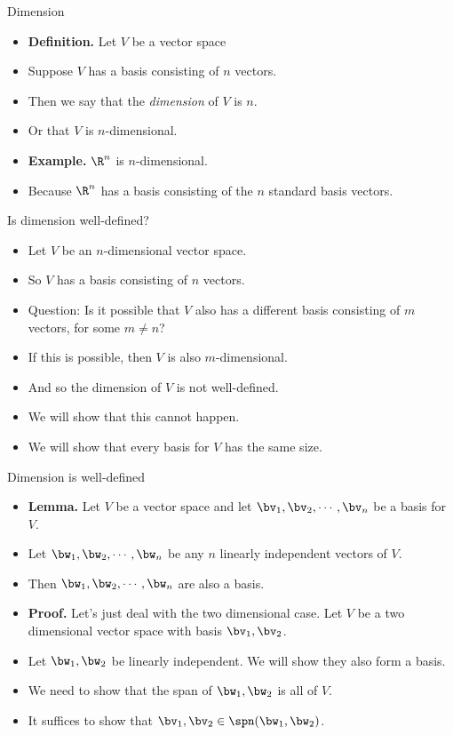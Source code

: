 \documentclass{beamer}
\begin{document}
\begin{frame}{Dimension}

\begin{itemize}
\item \textbf{Definition.} Let $V$ be a vector space
\item Suppose $V$ has a basis consisting of $n$ vectors.
\item Then we say that the \emph{dimension} of $V$ is $n$.
\item Or that $V$ is $n$-dimensional.
\item \textbf{Example.} $\R^n$ is $n$-dimensional.
\item Because $\R^n$ has a basis consisting of the $n$ standard basis vectors.
\end{itemize}

\end{frame}
\begin{frame}{Is dimension well-defined?}

\begin{itemize}
\item Let $V$ be an $n$-dimensional vector space.
\item So $V$ has a basis consisting of $n$ vectors.
\item Question: Is it possible that $V$ also has a different basis
consisting of $m$ vectors, for some $m\not=n$?
\item If this is possible, then $V$ is also $m$-dimensional.
\item And so the dimension of $V$ is not well-defined.
\item We will show that this cannot happen.
\item We will show that every basis for $V$ has the same size.
\end{itemize}

\end{frame}
\begin{frame}{Dimension is well-defined}

\begin{itemize}
\item \textbf{Lemma.} Let $V$ be a vector space and let $\bv_1,\bv_2,\cdots,\bv_n$ be a basis for $V$.
\item Let $\bw_1,\bw_2,\cdots,\bw_n$  be any $n$ linearly independent vectors of $V$.
\item Then $\bw_1,\bw_2,\cdots,\bw_n$ are also a basis.
\item \textbf{Proof.} Let's just deal with the two dimensional case.  Let $V$ be a two dimensional
vector space with basis $\bv_1,\bv_2$.
\item Let $\bw_1,\bw_2$ be linearly
independent. We will show they also form a basis.
\item We need to show that the span of $\bw_1,\bw_2$ is all of $V$.
\item It suffices to show that $\bv_1,\bv_2\in\spn(\bw_1,\bw_2)$.
\end{itemize}

\end{frame}
\end{document}

